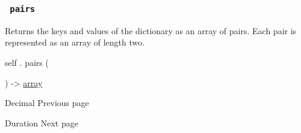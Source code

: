 \subsubsection{\texorpdfstring{\texttt{\ pairs\ }}{ pairs }}\label{definitions-pairs}

Returns the keys and values of the dictionary as an array of pairs. Each
pair is represented as an array of length two.

self { . } { pairs } (

) -\textgreater{} \href{/docs/reference/foundations/array/}{array}

\href{/docs/reference/foundations/decimal/}{\pandocbounded{}}

{ Decimal } { Previous page }

\href{/docs/reference/foundations/duration/}{\pandocbounded{}}

{ Duration } { Next page }
